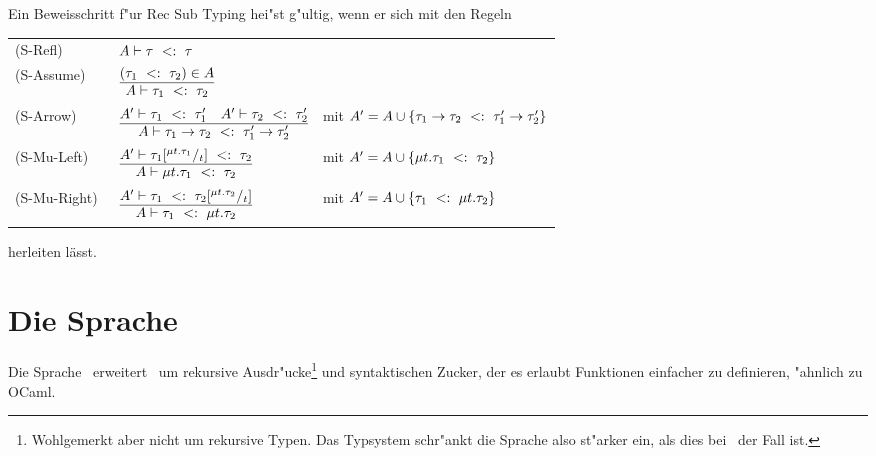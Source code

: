 Ein Beweisschritt f"ur Rec Sub Typing hei"st g"ultig, wenn er sich mit den Regeln  \\[5mm]
 \begin{tabular}{lll}
            \mbox{(S-Refl)\ } & $A \vdash \tau\ <:\ \tau$ \\[1mm]
            \mbox{(S-Assume)\ } & $\RULE{(\subtype{\tau_1} {\tau_2)} \in A}
                                   {A \vdash \subtype{\tau_1} {\tau_2}}$ \\[2mm]
            \mbox{(S-Arrow)\ } & $\RULE{A' \vdash \subtype{\tau_1} {\tau_1'}
                                   \quad
                                   A' \vdash \subtype{\tau_2} {\tau_2'}}
                                  {A \vdash \subtype{\typeArrow{\tau_1}{\tau_2}}
                                   {\typeArrow{\tau_1'}{\tau_2'}}}$ 
                                  & mit $A' = A \cup \{\tau_1\to\tau_2\ <:\ \tau_1'\to\tau_2'\}$ \\[2mm]
            \mbox{(S-Mu-Left)\ } & $\RULE{A' \vdash \subtype{\tau_1\SUB{\typeRec{t}{\tau_1}}{t}}
                                     {\tau_2}}
                                    {A \vdash \subtype{\typeRec{t}{\tau_1}} {\tau_2}}$
                                   & mit $A' = A \cup \{\mu t.\tau_1\ <:\ \tau_2\}$ \\[2mm]
            \mbox{(S-Mu-Right)\ } & $\RULE{A' \vdash \subtype{\tau_1}
                                     {\tau_2\SUB{\typeRec{t}{\tau_2}}{t}}}
                                    {A \vdash \subtype{\tau_1} {\typeRec{t}{\tau_2}}}$
                                   & mit $A' = A \cup \{\tau_1\ <:\ \mu t.\tau_2\}$ \\[2mm]
          \end{tabular}


herleiten l\"asst.



\section{Die Sprache \LTWO}

Die Sprache \LTWO\ erweitert \LONE\ um rekursive Ausdr"ucke\footnote{Wohlgemerkt aber nicht um rekursive Typen. Das
Typsystem schr"ankt die Sprache also st"arker ein, als dies bei \LONE\ der Fall ist.} und syntaktischen Zucker, der
es erlaubt Funktionen einfacher zu definieren, "ahnlich zu OCaml.

